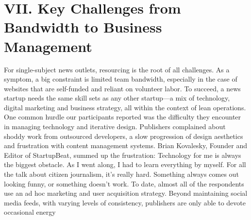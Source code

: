 \chapter{VII. Key Challenges from Bandwidth to Business Management}
For single-subject news outlets, resourcing is the root of all challenges. As
a symptom, a big constraint is limited team bandwidth, especially in the
case of websites that are self-funded and reliant on volunteer labor. To succeed,
a news startup needs the same skill sets as any other startup—a mix of
technology, digital marketing and business strategy, all within the context
of lean operations.
One common hurdle our participants reported was the difficulty they
encounter in managing technology and iterative design. Publishers complained
about shoddy work from outsourced developers, a slow progression
of design aesthetics and frustration with content management systems. Brian
Kovalesky, Founder and Editor of StartupBeat, summed up the frustration:
Technology for me is always the biggest obstacle. As I went along, I
had to learn everything by myself. For all the talk about citizen journalism,
it’s really hard. Something always comes out looking funny,
or something doesn’t work.
To date, almost all of the respondents use an ad hoc marketing and user
acquisition strategy. Beyond maintaining social media feeds, with varying
levels of consistency, publishers are only able to devote occasional energy

